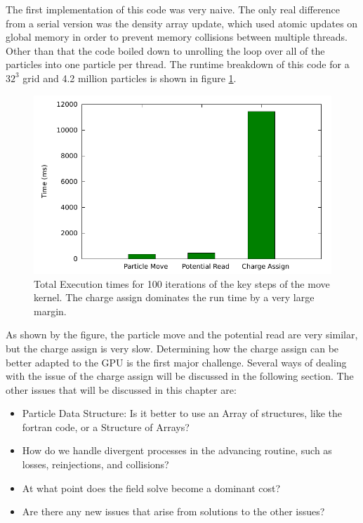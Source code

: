 The first implementation of this code was very naive. The only real difference from a serial version was the density array update, which used atomic updates on global memory in order to prevent memory collisions between multiple threads. Other than that the code boiled down to unrolling the loop over all of the particles into one particle per thread. The runtime breakdown of this code for a $32^3$ grid and 4.2 million particles is shown in figure \ref{fig:GPUPIC_basetime}.


\begin{figure}
\begin{center}
\includegraphics[width=5in]{design/sandbox_run_histo.pdf}
\end{center}
\caption[Sandbox GPUPIC Code Profile]{Total Execution times for 100 iterations of the key steps of the move kernel. The charge assign dominates the run time by a very large margin.}
\label{fig:GPUPIC_basetime} 
\end{figure}



As shown by the figure, the particle move and the potential read are very similar, but the charge assign is very slow. Determining how the charge assign can be better adapted to the GPU is the first major challenge. Several ways of dealing with the issue of the charge assign will be discussed in the following section. The other issues that will be discussed in this chapter are:

\begin{itemize}\itemsep0pt \parskip0pt 
\item Particle Data Structure: Is it better to use an Array of structures, like the fortran code, or a Structure of Arrays?
\item How do we handle divergent processes in the advancing routine, such as losses, reinjections, and collisions?
\item At what point does the field solve become a dominant cost?
\item Are there any new issues that arise from solutions to the other issues?
\end{itemize}

